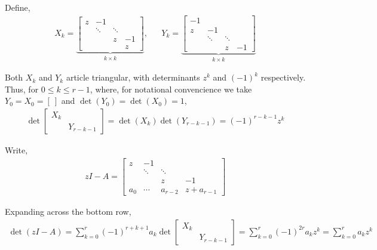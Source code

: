 \documentclass[10pt]{article}
\begin{document}
\begin{solution}[Solution]


Define,
\begin{align*}
    X_k = \underbrace{\left[\begin{array}{cccc}
        z & -1 \\
        & \ddots & \ddots \\
        & & z & -1 \\
        & & & z
    \end{array}\right]}_{k\times k}
    , &&
    Y_k = \underbrace{\left[\begin{array}{cccc}
        -1 & \\
        z & -1 \\
        & \ddots & \ddots \\
        & & z & -1
    \end{array}\right]}_{k\times k}
\end{align*}

Both \( X_k \) and \( Y_k \) article triangular, with determinants \( z^k \) and \( (-1)^k \) respectively.
Thus, for \( 0\leq k\leq r-1 \), where, for notational convencience we take \( Y_0 = X_0 = [~] \) and \( \det(Y_0) = \det(X_0) = 1 \),
\begin{align*}
    \det \left[\begin{array}{cc}X_k \\ & Y_{r-k-1}  \end{array}\right] =  \det(X_k)\det(Y_{r-k-1}) = (-1)^{r-k-1}z^k
\end{align*}

Write,
\begin{align*}
    zI - A = \left[\begin{array}{cccc}
      z & -1 \\
      & \ddots & \ddots \\
      & & z & -1 \\
      a_0 & \cdots & a_{r-2} & z+a_{r-1}
    \end{array}\right]
\end{align*}

Expanding across the bottom row,
\begin{align*}
    \det(zI-A) = \sum_{k = 0}^{r}(-1)^{r+k+1}a_k \det \left[\begin{array}{cc}X_k \\ & Y_{r-k-1}  \end{array}\right]
    = \sum_{k=0}^{r}(-1)^{2r} a_kz^k
    = \sum_{k=0}^{r}a_kz^k \tag*{\qed}
\end{align*}



\end{solution}
\end{document}
